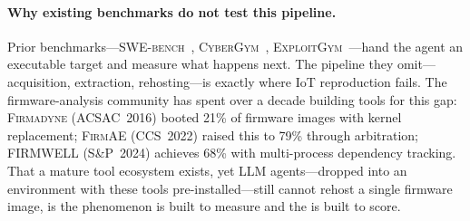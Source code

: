 \paragraph{Why existing benchmarks do not test this pipeline.}
Prior benchmarks---\textsc{SWE-bench}~\cite{jimenez2024swebench}, \textsc{CyberGym}~\cite{wang2025cybergym}, \textsc{ExploitGym}~\cite{exploitgym}---hand the agent an executable target and measure what happens next. The pipeline they omit---acquisition, extraction, rehosting---is exactly where IoT reproduction fails. The firmware-analysis community has spent over a decade building tools for this gap: \textsc{Firmadyne} (ACSAC~2016) booted 21\% of firmware images with kernel replacement; \textsc{FirmAE} (CCS~2022) raised this to 79\% through arbitration; \textsc{FIRMWELL} (S\&P~2024) achieves 68\% with multi-process dependency tracking. That a mature tool ecosystem exists, yet LLM agents---dropped into an environment with these tools pre-installed---still cannot rehost a single firmware image, is the phenomenon \sys is built to measure and the \rrs is built to score.
